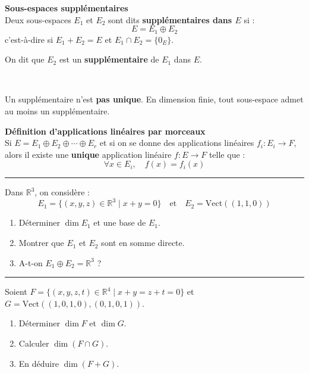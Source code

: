 \documentclass[../PolyS4.tex]{subfiles}
\begin{document}
\begin{Def}\textbf{Sous-espaces supplémentaires}\\

Deux sous-espaces $E_1$ et $E_2$ sont dits \textbf{supplémentaires dans $E$} si :
$$E = E_1 \oplus E_2$$
c'est-à-dire si $E_1 + E_2 = E$ et $E_1 \cap E_2 = \{0_E\}$.

On dit que $E_2$ est un \textbf{supplémentaire} de $E_1$ dans $E$.
\end{Def}

\begin{Rmq}$\,$

Un supplémentaire n'est \textbf{pas unique}. En dimension finie, tout sous-espace admet au moins un supplémentaire.
\end{Rmq}

\begin{Prop}\textbf{Définition d'applications linéaires par morceaux}\\

Si $E = E_1 \oplus E_2 \oplus \cdots \oplus E_r$ et si on se donne des applications linéaires $f_i : E_i \to F$, alors il existe une \textbf{unique} application linéaire $f : E \to F$ telle que :
$$\forall x \in E_i, \quad f(x) = f_i(x)$$
\end{Prop}

\vspace{1em}
\hrule
\vspace{1em}


Dans $\mathbb{R}^3$, on considère :
$$E_1 = \{(x, y, z) \in \mathbb{R}^3 \mid x + y = 0\} \quad \text{et} \quad E_2 = \text{Vect}((1, 1, 0))$$
\begin{enumerate}
    \item Déterminer $\dim E_1$ et une base de $E_1$.
    \item Montrer que $E_1$ et $E_2$ sont en somme directe.
    \item A-t-on $E_1 \oplus E_2 = \mathbb{R}^3$ ?
\end{enumerate}

\vspace{1em}
\hrule
\vspace{1em}


Soient $F = \{(x, y, z, t) \in \mathbb{R}^4 \mid x + y = z + t = 0\}$ et $G = \text{Vect}((1, 0, 1, 0), (0, 1, 0, 1))$.
\begin{enumerate}
    \item Déterminer $\dim F$ et $\dim G$.
    \item Calculer $\dim(F \cap G)$.
    \item En déduire $\dim(F + G)$.
\end{enumerate}
\end{document}
